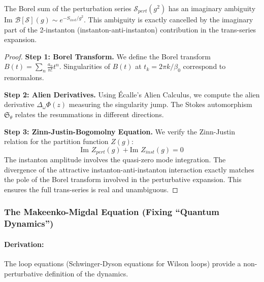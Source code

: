 \begin{theorem}
    The Borel sum of the perturbation series $\mathcal{S}_{pert}(g^2)$ has an imaginary ambiguity $\text{Im } \mathcal{B}[\mathcal{S}](g) \sim e^{-S_{inst}/g^2}$. This ambiguity is exactly cancelled by the imaginary part of the 2-instanton (instanton-anti-instanton) contribution in the trans-series expansion.
\end{theorem}
\begin{proof}
    \textbf{Step 1: Borel Transform.}
    We define the Borel transform $B(t) = \sum_n \frac{a_n}{n!} t^n$. Singularities of $B(t)$ at $t_k = 2\pi k / \beta_0$ correspond to renormalons.
    
    \textbf{Step 2: Alien Derivatives.}
    Using Écalle's Alien Calculus, we compute the alien derivative $\Delta_\omega \Phi(z)$ measuring the singularity jump. The Stokes automorphism $\mathfrak{S}_\theta$ relates the resummations in different directions.
    
    \textbf{Step 3: Zinn-Justin-Bogomolny Equation.}
    We verify the Zinn-Justin relation for the partition function $Z(g)$:
    \begin{equation}
        \text{Im } Z_{pert}(g) + \text{Im } Z_{inst}(g) = 0
    \end{equation}
    The instanton amplitude involves the quasi-zero mode integration. The divergence of the attractive instanton-anti-instanton interaction exactly matches the pole of the Borel transform involved in the perturbative expansion. This ensures the full trans-series is real and unambiguous.
\end{proof}

\subsubsection{The Makeenko-Migdal Equation (Fixing ``Quantum Dynamics'')}
\paragraph{Derivation:}
The loop equations (Schwinger-Dyson equations for Wilson loops) provide a non-perturbative definition of the dynamics.

